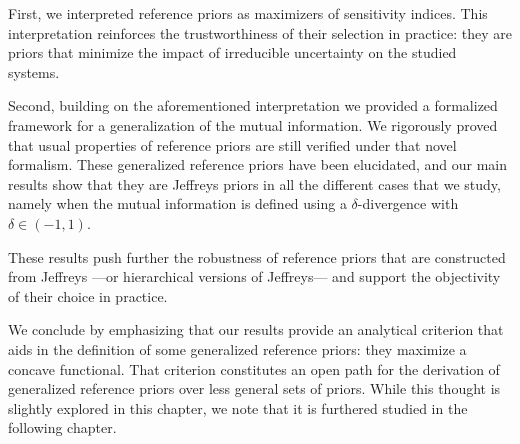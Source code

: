 First, we interpreted reference priors as maximizers of sensitivity indices. This interpretation reinforces the trustworthiness of their selection in practice: they are  priors that minimize the impact of irreducible uncertainty on the studied systems. %

Second, building on the aforementioned interpretation 
we provided a formalized framework for a generalization of the mutual information. We rigorously proved that usual properties of reference priors are still verified under that novel formalism. These generalized reference priors have been elucidated, and our main results show that they are Jeffreys priors in all the different cases that we study, namely when the mutual information is defined using a $\delta$-divergence with $\delta\in(-1,1)$.

These results
push further the robustness of reference priors that are constructed from Jeffreys ---or hierarchical versions of Jeffreys--- and support the objectivity of their choice in practice.


We conclude by emphasizing that our results provide  an analytical criterion that aids in the definition of some generalized reference priors: they maximize a concave functional.
That criterion constitutes an open path for the derivation of generalized reference priors over less general sets of priors.
While this thought is slightly explored in this chapter, we note that it is furthered studied in the following chapter.












